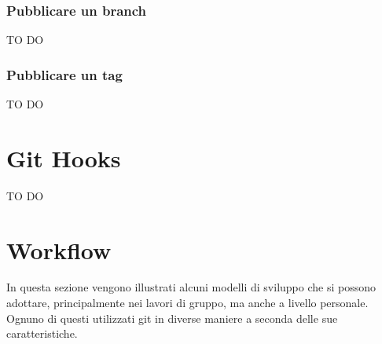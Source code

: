 		\subsubsection{Pubblicare un branch} %
		\label{ssub:pubblicare_un_branch}
		TO DO

		\subsubsection{Pubblicare un tag} %
		\label{ssub:pubblicare_un_tag}
		TO DO



\newpage \clearpage
\section{Git Hooks} %
\label{sec:git_hooks}
TO DO






\newpage \clearpage
\section{Workflow} %
\label{sec:workflow}
In questa sezione vengono illustrati alcuni modelli di sviluppo che si possono adottare, principalmente nei lavori di gruppo, ma anche a livello personale. Ognuno di questi utilizzati git in diverse maniere a seconda delle sue caratteristiche.
